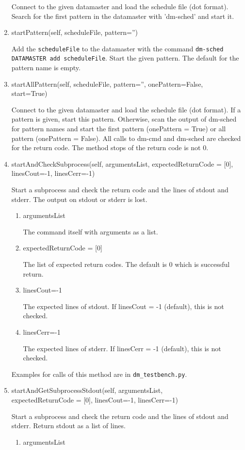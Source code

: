 \documentclass[12pt,a4paper]{report}
\begin{document}
\begin{enumerate}
Connect to the given datamaster and load the schedule file (dot format).
Search for the first pattern in the datamaster with 'dm-sched' and start it.
\item startPattern(self, scheduleFile, pattern='')

Add the \texttt{scheduleFile} to the datamaster with the command
\texttt{dm-sched DATAMASTER add scheduleFile}. Start the given pattern.
The default for the pattern name is empty.
\item startAllPattern(self, scheduleFile, pattern='', onePattern=False,\\ start=True)

Connect to the given datamaster and load the schedule file (dot format).
If a pattern is given, start this pattern.
Otherwise, scan the output of dm-sched for pattern names and start the
first pattern (onePattern = True) or all pattern (onePattern = False).
All calls to dm-cmd and dm-sched are checked for the return code. The method
stops of the return code is not 0.

\item startAndCheckSubprocess(self, argumentsList, expectedReturnCode =
[0], linesCout=-1, linesCerr=-1)

Start a subprocess and check the return code and the lines of stdout
and stderr. The output on stdout or stderr is lost.
\begin{enumerate}
\item argumentsList

The command itself with arguments as a list.
\item expectedReturnCode = [0]

The list of expected return codes. The default is 0 which is successful return.
\item linesCout=-1

The expected lines of stdout. If linesCout = -1 (default), this is not checked.
\item linesCerr=-1

The expected lines of stderr. If linesCerr = -1 (default), this is not checked.
\end{enumerate}
Examples for calls of this method are in \texttt{dm\_testbench.py}.
\item startAndGetSubprocessStdout(self, argumentsList, \\
expectedReturnCode = [0], linesCout=-1, linesCerr=-1)

Start a subprocess and check the return code and the lines of stdout
and stderr. Return stdout as a list of lines.
\begin{enumerate}
\item argumentsList


\end{enumerate}
\end{enumerate}
\end{document}
